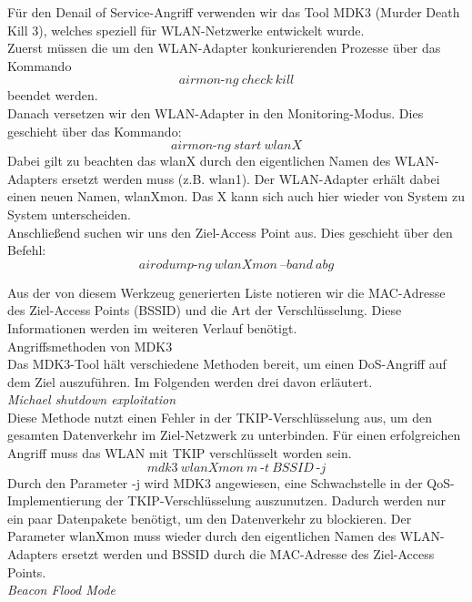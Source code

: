 Für den Denail of Service-Angriff verwenden wir das Tool MDK3 (Murder Death Kill 3), welches speziell für WLAN-Netzwerke entwickelt wurde.\\

Zuerst müssen die um den WLAN-Adapter konkurierenden Prozesse über das Kommando 
$$airmon\text{-}ng~check~kill$$
beendet werden. \\

Danach versetzen wir den WLAN-Adapter in den Monitoring-Modus. Dies geschieht über das Kommando: 
$$airmon\text{-}ng~start~wlanX$$
Dabei gilt zu beachten das wlanX durch den eigentlichen Namen des WLAN-Adapters ersetzt werden muss (z.B. wlan1). 
Der WLAN-Adapter erhält dabei einen neuen Namen, wlanXmon. Das X kann sich auch hier wieder von System zu System unterscheiden.\\

Anschließend suchen wir uns den Ziel-Access Point aus. Dies geschieht über den Befehl: 
$$airodump\text{-}ng~wlanXmon~\text{--}band~abg$$

Aus der von diesem Werkzeug generierten Liste notieren wir die MAC-Adresse des Ziel-Access Points (BSSID) und die Art der Verschlüsselung. Diese Informationen werden im weiteren Verlauf benötigt.\\

{\Large Angriffsmethoden von MDK3}\\
Das MDK3-Tool hält verschiedene Methoden bereit, um einen DoS-Angriff auf dem Ziel auszuführen. Im Folgenden werden drei davon erläutert.\\

\textit{Michael shutdown exploitation}\\

Diese Methode nutzt einen Fehler in der TKIP-Verschlüsselung aus, um den gesamten Datenverkehr im Ziel-Netzwerk zu unterbinden. Für einen erfolgreichen Angriff muss das WLAN mit TKIP verschlüsselt worden sein.\\
$$mdk3~wlanXmon~m~\text{-}t~BSSID~\text{-}j$$
Durch den Parameter -j wird MDK3 angewiesen, eine Schwachstelle in der QoS-Implementierung der TKIP-Verschlüsselung auszunutzen. Dadurch werden nur ein paar Datenpakete benötigt, um den Datenverkehr zu blockieren.
Der Parameter wlanXmon muss wieder durch den eigentlichen Namen des WLAN-Adapters ersetzt werden und BSSID durch die MAC-Adresse des Ziel-Access Points.\\

\textit{Beacon Flood Mode}\\

